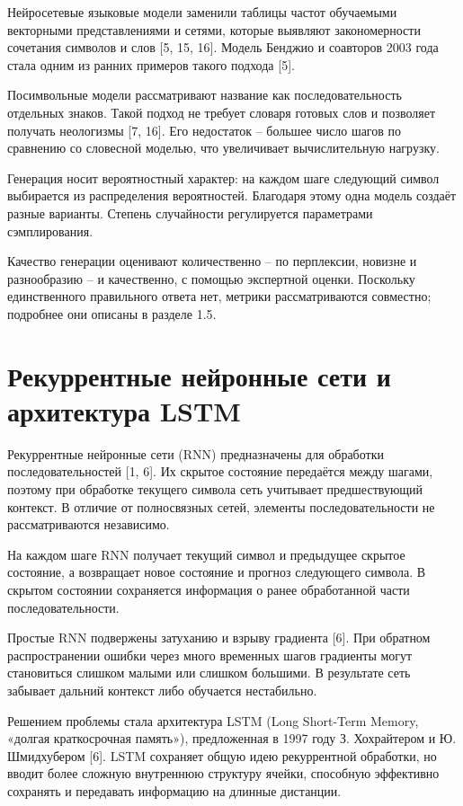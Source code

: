 Нейросетевые языковые модели заменили таблицы частот обучаемыми векторными представлениями и сетями, которые выявляют закономерности сочетания символов и слов {[}5, 15, 16{]}. Модель Бенджио и соавторов 2003 года стала одним из ранних примеров такого подхода {[}5{]}.

Посимвольные модели рассматривают название как последовательность отдельных знаков. Такой подход не требует словаря готовых слов и позволяет получать неологизмы {[}7, 16{]}. Его недостаток -- большее число шагов по сравнению со словесной моделью, что увеличивает вычислительную нагрузку.

Генерация носит вероятностный характер: на каждом шаге следующий символ выбирается из распределения вероятностей. Благодаря этому одна модель создаёт разные варианты. Степень случайности регулируется параметрами сэмплирования.

Качество генерации оценивают количественно -- по перплексии, новизне и разнообразию -- и качественно, с помощью экспертной оценки. Поскольку единственного правильного ответа нет, метрики рассматриваются совместно; подробнее они описаны в разделе 1.5.

\section{Рекуррентные нейронные сети и архитектура LSTM}\label{ux440ux435ux43aux443ux440ux440ux435ux43dux442ux43dux44bux435-ux43dux435ux439ux440ux43eux43dux43dux44bux435-ux441ux435ux442ux438-ux438-ux430ux440ux445ux438ux442ux435ux43aux442ux443ux440ux430-lstm}

Рекуррентные нейронные сети (RNN) предназначены для обработки последовательностей {[}1, 6{]}. Их скрытое состояние передаётся между шагами, поэтому при обработке текущего символа сеть учитывает предшествующий контекст. В отличие от полносвязных сетей, элементы последовательности не рассматриваются независимо.

На каждом шаге RNN получает текущий символ и предыдущее скрытое состояние, а возвращает новое состояние и прогноз следующего символа. В скрытом состоянии сохраняется информация о ранее обработанной части последовательности.

Простые RNN подвержены затуханию и взрыву градиента {[}6{]}. При обратном распространении ошибки через много временных шагов градиенты могут становиться слишком малыми или слишком большими. В результате сеть забывает дальний контекст либо обучается нестабильно.

Решением проблемы стала архитектура LSTM (Long Short-Term Memory, «долгая краткосрочная память»), предложенная в 1997 году З. Хохрайтером и Ю. Шмидхубером {[}6{]}. LSTM сохраняет общую идею рекуррентной обработки, но вводит более сложную внутреннюю структуру ячейки, способную эффективно сохранять и передавать информацию на длинные дистанции.

